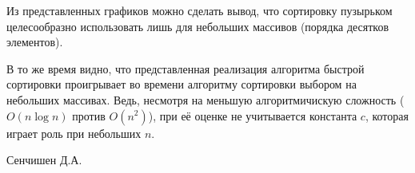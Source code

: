 \documentclass[
	12pt,
	paper=A4,
	oneside,
	draft
]{scrreprt}
\begin{document}
Из представленных графиков можно сделать вывод, что сортировку пузырьком целесообразно использовать лишь для небольших массивов (порядка десятков элементов). 

В то же время видно, что представленная реализация алгоритма быстрой сортировки проигрывает во времени алгоритму сортировки выбором на небольших массивах. Ведь, несмотря на меньшую алгоритмичискую сложность ($O(n\log n)$ против $O(n^2)$), при её оценке не учитывается константа $c$, которая играет роль при небольших $n$.
\vfill
\begin{flushright}
Сенчишен Д.А.
\end{flushright}
\end{document}
